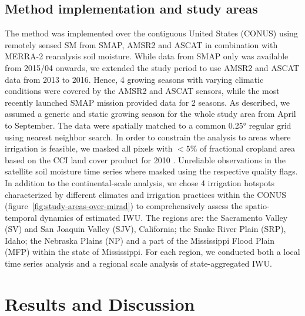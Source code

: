 \documentclass[hess, manuscript]{copernicus}
\begin{document}
\subsection{Method implementation and study areas}
The method was implemented over the contiguous United States (CONUS) using remotely sensed SM from SMAP, AMSR2 and ASCAT in combination with MERRA-2 reanalysis soil moisture. While data from SMAP only was available from 2015/04 onwards, we extended the study period to use AMSR2 and ASCAT data from 2013 to 2016. Hence, 4 growing seasons with varying climatic conditions were covered by the AMSR2 and ASCAT sensors, while the most recently launched SMAP mission provided data for 2 seasons. As described, we assumed a generic and static growing season for the whole study area from April to September. The data were spatially matched to a common 0.25\si{\degree} regular grid using nearest neighbor search. In order to constrain the analysis to areas where irrigation is feasible, we masked all pixels with $<5\%$ of fractional cropland area based on the CCI land cover product for 2010 \citep{bontemps2013consistent}. Unreliable observations in the satellite soil moisture time series where masked using the respective quality flags. In addition to the continental-scale analysis, we chose 4 irrigation hotspots characterized by different climates and irrigation practices within the CONUS (figure~\ref{fig:study-areas-over-mirad}) to comprehensively assess the spatio-temporal dynamics of estimated IWU. The regions are: the Sacramento Valley (SV) and San Joaquin Valley (SJV), California; the Snake River Plain (SRP), Idaho; the Nebraska Plains (NP) and a part of the Mississippi Flood Plain (MFP) within the state of Mississippi. For each region, we conducted both a local time series analysis and a regional scale analysis of state-aggregated IWU.
\newpage
\section{Results and Discussion}
\label{sec:results-and-discussion}
\end{document}
